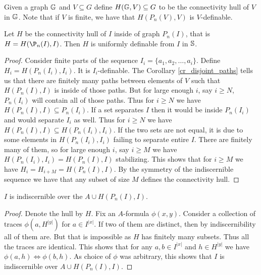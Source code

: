 \begin{Definition}
  Given a graph $\mathbb G$ and $V \subseteq G$ define $H(\mathbb G, V) \subseteq G$ to be the connectivity hull of $V$ in $\mathbb G$.
  Note that if $V$ is finite, we have that $H(P_n(V), V)$ is $V$-definable.
\end{Definition}

\begin{Lemma} \label{lm_uniform}
  Let $H$ be the connectivity hull of $I$ inside of graph $P_n(I)$, that is $H = H(\P_n(I), I)$.
  Then $H$ is uniformly definable from $I$ in $\mathbb S$.
\end{Lemma}

\begin{proof}%
  Consider finite parts of the sequence $I_i = \{a_1, a_2, \ldots, a_i\}$.
  Define $H_i = H(P_n(I_i), I_i)$.
  It is $I_i$-definable. %
  The Corollary \ref{cr_disjoint_paths} tells us that there are finitely many paths between elements of $V$ such that
  $H(P_n(I), I)$ is inside of those paths.
  But for large enough $i$, say $i \geq N$, $P_n(I_i)$ will contain all of those paths.
  Thus for $i \geq N$ we have $H(P_n(I), I) \subseteq P_n(I_i)$.
  If a set separates $I$ then it would be inside $P_n(I_i)$ and would separate $I_i$ as well.
  Thus for $i \geq N$ we have $H(P_n(I), I) \subseteq H(P_n(I_i), I_i)$.
  If the two sets are not equal, it is due to some elements in $H(P_n(I_i), I_i)$ failing to separate entire $I$.
  There are finitely many of them, so for large enough $i$, say $i \geq M$ we have $H(P_n(I_i), I_i) = H(P_n(I), I)$ stabilizing.
  This shows that for $i \geq M$ we have $H_i = H_{i+M} = H(P_n(I), I)$.
  By the symmetry of the indiscernible sequence we have that any subset of size $M$ defines the connectivity hull.
\end{proof}

\begin{Lemma} \label{cr_bump}
  $I$ is indiscernible over the $A \cup H(P_n(I), I)$.
\end{Lemma}

\begin{proof}
  Denote the hull by $H$. Fix an $A$-formula $\phi(x,y)$. Consider a collection of traces $\phi(a, H^{|y|})$ for $a \in I^{|x|}$. If two of them are distinct, then by indiscernibility all of them are. But that is impossible as $H$ has finitely many subsets. Thus all the traces are identical. This shows that for any $a,b \in I^{|x|}$ and $h \in H^{|y|}$ we have $\phi(a, h) \iff \phi(b, h)$. As choice of $\phi$ was arbitrary, this shows that $I$ is indiscernible over $A \cup H(P_n(I), I)$.
\end{proof}

